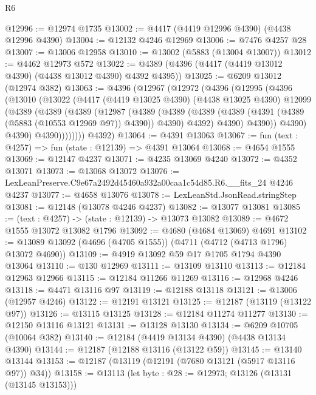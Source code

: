 \begin{lexlean}{R6}
\begin{coremodule}
@12996 := @12974 @1735
@13002 := @4417 (@4419 @12996 @4390) (@4438 @12996 @4390)
@13004 := @12132 @4246 @12969
@13006 := @7476 @4257 @28
@13007 := @13006 @12958
@13010 := @13002 (@5883 (@13004 @13007))
@13012 := @4462 @12973 @572
@13022 := @4389 (@4396 (@4417 (@4419 @13012 @4390) (@4438 @13012 @4390) @4392 @4395))
@13025 := @6209 @13012 (@12974 @382)
@13063 := @4396
    (@12967
      (@12972
        (@4396
          (@12995
            (@4396
              (@13010
                (@13022
                  (@4417
                    (@4419 @13025 @4390)
                    (@4438 @13025 @4390)
                    @12099
                    (@4389
                      (@4389
                        (@4389
                          (@12987
                            (@4389
                              (@4389
                                (@4389
                                  (@4389 (@4391 (@4389 (@5883 (@10553 @12969 @97)) @4390)) @4390)
                                  @4392)
                                @4390)
                              @4390))
                          @4390)
                        @4390)
                      @4390))))))))
      @4392)
@13064 := @4391 @13063
@13067 := fun (text : @4257) => fun (state : @12139) => @4391 @13064
@13068 := @4654 @1555
@13069 := @12147 @4237
@13071 := @4235 @13069 @4240
@13072 := @4352 @13071
@13073 := @13068 @13072
@13076 := LexLeanPreserve.C9e67a2492d45460a932a00caa1c54d85.R6.__fits_24 @4246 @4237
@13077 := @4658 @13076
@13078 := LexLeanStd.JsonRead.stringStep
@13081 := @12148 (@13078 @4246 @4237)
@13082 := @13077 @13081
@13085 := (text : @4257) -> (state : @12139) -> @13073 @13082
@13089 := @4672 @1555 @13072 @13082 @1796
@13092 := @4680 (@4684 @13069) @4691
@13102 := @13089 @13092 (@4696 (@4705 @1555)) (@4711 (@4712 (@4713 @1796) @13072 @4690))
@13109 := @4919 @13092 @59 @17 @1705 @1794 @4390 @13064
@13110 := @130 @12969
@13111 := @13109 @13110
@13113 := @12184 @12963 @12966
@13115 := @12184 @11266 @11269
@13116 := @12968 @4246
@13118 := @4471 @13116 @97
@13119 := @12188 @13118
@13121 := @13006 (@12957 @4246)
@13122 := @12191 @13121
@13125 := @12187 (@13119 (@13122 @97))
@13126 := @13115 @13125
@13128 := @12184 @11274 @11277
@13130 := @12150 @13116 @13121
@13131 := @13128 @13130
@13134 := @6209 @10705 (@10064 @382)
@13140 := @12184 (@4419 @13134 @4390) (@4438 @13134 @4390)
@13144 := @12187 (@12188 @13116 (@13122 @59))
@13145 := @13140 @13144
@13153 := @12187 (@13119 (@12191 (@7680 @13121 (@5917 @13116 @97)) @34))
@13158 := @13113 (let byte : @28 := @12973; @13126 (@13131 (@13145 @13153)))

\end{coremodule}
\end{lexlean}
